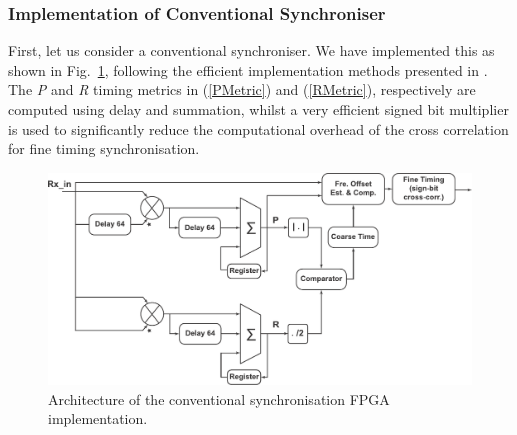 		\subsubsection{Implementation of Conventional Synchroniser}

First, let us consider a conventional synchroniser. We have implemented this as shown in Fig.~\ref{fig:Con-Sync}, following the efficient implementation methods presented in \cite{Manavi2004,Wang2004,Guffey2007,Liu2009}.
The \emph{P} and \emph{R} timing metrics in (\ref{PMetric}) and (\ref{RMetric}), respectively are computed using delay and summation, whilst a very efficient signed bit multiplier \cite{Schwoerer2002} is used to significantly reduce the computational overhead of the cross correlation for fine timing synchronisation.

\begin{figure}[h]
	\centerline{\includegraphics [width=1\columnwidth] {figures/Con_Sync.pdf}}
	\caption{Architecture of the conventional synchronisation FPGA implementation.}
	\label{fig:Con-Sync}
\end{figure}

